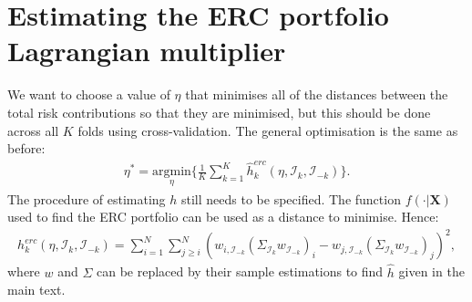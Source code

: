 \documentclass[a4paper,11pt,nocenter,bold,noupper,headcount]{mythesis}
\theoremstyle{plain}
\theoremstyle{definition}
\begin{document}
\section{Estimating the ERC portfolio Lagrangian multiplier} \label{eta_est}

We want to choose a value of $\eta$ that minimises all of the distances between the total risk contributions so that they are minimised, but this should be done across all $K$ folds using cross-validation. The general optimisation is the same as before:
\begin{align}
\eta^* = \underset{\eta}{\text{argmin}} \Big \{ \frac{1}{K} \sum_{k = 1}^K \hat{h}_k^{erc}(\eta, \mathcal{I}_k, \mathcal{I}_{-k})\Big \}.
\end{align}
The procedure of estimating $h$ still needs to be specified. The function $f(\cdot|\textbf{X})$ used to find the ERC portfolio can be used as a distance to minimise. Hence:
\begin{align}
h_k^{erc}(\eta, \mathcal{I}_k, \mathcal{I}_{-k}) = \sum_{i = 1}^N  \sum_{j \geq i}^N(w_{i, \mathcal{I}_{-k}}(\Sigma_{\mathcal{I}_k} w_{\mathcal{I}_{-k}})_i - w_{j, \mathcal{I}_{-k}}(\Sigma_{\mathcal{I}_k} w_{\mathcal{I}_{-k}})_j )^2,
\end{align}
 where $w$ and $\Sigma$ can be replaced by their sample estimations to find $\hat{h}$ given in the main text.
\end{document}
